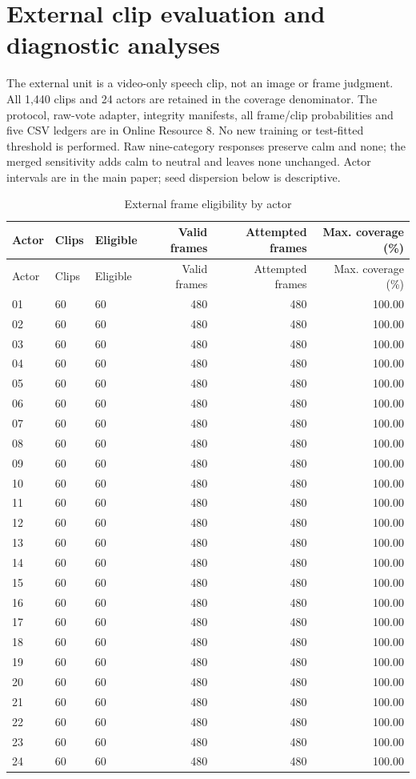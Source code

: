 \documentclass[10pt]{article}
\begin{document}
\clearpage\section{External clip evaluation and diagnostic analyses}\label{supp:external}
The external unit is a video-only speech clip, not an image or frame judgment. All 1,440 clips and 24 actors are retained in the coverage denominator. The protocol, raw-vote adapter, integrity manifests, all frame/clip probabilities and five CSV ledgers are in Online Resource 8. No new training or test-fitted threshold is performed. Raw nine-category responses preserve calm and none; the merged sensitivity adds calm to neutral and leaves none unchanged. Actor intervals are in the main paper; seed dispersion below is descriptive.
\begin{longtable}{lllrrr}
\caption{External frame eligibility by actor}\\
\toprule Actor & Clips & Eligible & Valid frames & Attempted frames & Max. coverage (\%)\\\midrule\endfirsthead
\toprule Actor & Clips & Eligible & Valid frames & Attempted frames & Max. coverage (\%)\\\midrule\endhead
01 & 60 & 60 & 480 & 480 & 100.00\\
02 & 60 & 60 & 480 & 480 & 100.00\\
03 & 60 & 60 & 480 & 480 & 100.00\\
04 & 60 & 60 & 480 & 480 & 100.00\\
05 & 60 & 60 & 480 & 480 & 100.00\\
06 & 60 & 60 & 480 & 480 & 100.00\\
07 & 60 & 60 & 480 & 480 & 100.00\\
08 & 60 & 60 & 480 & 480 & 100.00\\
09 & 60 & 60 & 480 & 480 & 100.00\\
10 & 60 & 60 & 480 & 480 & 100.00\\
11 & 60 & 60 & 480 & 480 & 100.00\\
12 & 60 & 60 & 480 & 480 & 100.00\\
13 & 60 & 60 & 480 & 480 & 100.00\\
14 & 60 & 60 & 480 & 480 & 100.00\\
15 & 60 & 60 & 480 & 480 & 100.00\\
16 & 60 & 60 & 480 & 480 & 100.00\\
17 & 60 & 60 & 480 & 480 & 100.00\\
18 & 60 & 60 & 480 & 480 & 100.00\\
19 & 60 & 60 & 480 & 480 & 100.00\\
20 & 60 & 60 & 480 & 480 & 100.00\\
21 & 60 & 60 & 480 & 480 & 100.00\\
22 & 60 & 60 & 480 & 480 & 100.00\\
23 & 60 & 60 & 480 & 480 & 100.00\\
24 & 60 & 60 & 480 & 480 & 100.00\\
\bottomrule\end{longtable}
\end{document}
